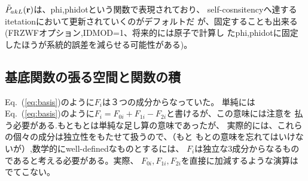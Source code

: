 \documentclass[a4paper,10pt,aip,onecolumn,amsmath,amssymb,floatfix,rmp]{revtex4-1}
\newcommand{\bfr}{{\bf r}}
\newcommand{\req}[1]{\mbox{Eq.~\!(\ref{#1})}}
\begin{document}
$\tilde{P}_{akL}(\bfr)$は、phi,phidotという関数で表現されており、
self-cosnsitencyへ達するitetationにおいて更新されていくのがデフォルトだ
が、固定することも出来る(FRZWFオプション,IDMOD=1、将来的には原子で計算し
たphi,phidotに固定したほうが系統的誤差を減らせる可能性がある)。


\subsection{基底関数の張る空間と関数の積} 
\req{eq:basis}のように$F_i$は３つの成分からなっていた。
単純には\req{eq:basis}のように$F_i=F_{0i}+F_{1i}-F_{2i}$と書けるが、この意味には注意を
払う必要がある.もともとは単純な足し算の意味であったが、
実際的には、これらの個々の成分は独立性をもたせて扱うので、（もと
もとの意味を忘れてはいけないが）,数学的にwell-definedなものとするには、
$F_i$は独立な3成分からなるものであると考える必要がある。実際、
$F_{0i},F_{1i},F_{2i}$を直接に加減するような演算はでてこない。


%
%
%
\end{document}

